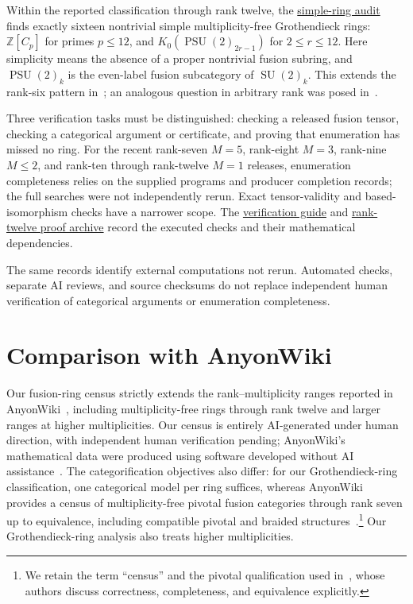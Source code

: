 \documentclass[11pt,a4paper]{article}
\newcommand{\classcommit}{d920cc2531d8b03583c797886a3c2ab6170a281a}
\newcommand{\classrepo}{https://github.com/sebastienpalcoux/grothendieck-ring-classification}
\newcommand{\prooflink}[2]{\href{\classrepo/blob/\classcommit/#1}{#2}}
\begin{document}
Within the reported classification through rank twelve, the
\prooflink{docs/SIMPLE_MULTIPLICITY_ONE.md}{simple-ring audit} finds
exactly sixteen nontrivial simple multiplicity-free Grothendieck rings:
$\mathbb Z[C_p]$ for primes $p\leq12$, and
$K_0(\operatorname{PSU}(2)_{2r-1})$ for $2\leq r\leq12$.
Here simplicity means the absence of a proper nontrivial fusion subring,
and $\operatorname{PSU}(2)_k$ is the even-label fusion subcategory of
$\operatorname{SU}(2)_k$.
This extends the rank-six pattern in~\cite[Corollary~5.9]{LPR22};
an analogous question in arbitrary rank was posed
in~\cite[Question~5.10]{LPR22}.

Three verification tasks must be distinguished: checking a released
fusion tensor, checking a categorical argument or certificate, and proving
that enumeration has missed no ring. For the recent rank-seven $M=5$,
rank-eight $M=3$, rank-nine $M\leq2$, and rank-ten through rank-twelve
$M=1$ releases, enumeration completeness relies on the supplied programs
and producer completion records; the full searches were not independently
rerun. Exact tensor-validity and based-isomorphism checks have a narrower
scope. The \prooflink{docs/VERIFY.md}{verification guide} and
\prooflink{evidence/rank12_m1_20261026/README.md}{rank-twelve proof archive}
record the executed checks and their mathematical dependencies.

The same records identify external computations not rerun. Automated
checks, separate AI reviews, and source checksums do not replace
independent human verification of categorical arguments or enumeration
completeness.

\section{Comparison with AnyonWiki}
Our fusion-ring census strictly extends the rank--multiplicity ranges
reported in AnyonWiki~\cite[Table~1]{AW}, including multiplicity-free
rings through rank twelve and larger ranges at higher multiplicities.
Our census is entirely AI-generated under human direction, with independent
human verification pending; AnyonWiki's mathematical data were produced
using software developed without AI assistance~\cite{AW}.
The categorification objectives also differ: for our Grothendieck-ring
classification, one categorical model per ring suffices, whereas
AnyonWiki provides a census of multiplicity-free pivotal fusion categories
through rank seven up to equivalence, including compatible pivotal and
braided structures~\cite{VS26}.\footnote{We retain the term ``census''
and the pivotal qualification used in~\cite{VS26}, whose authors discuss
correctness, completeness, and equivalence explicitly.}
Our Grothendieck-ring analysis also treats higher multiplicities.
\end{document}
